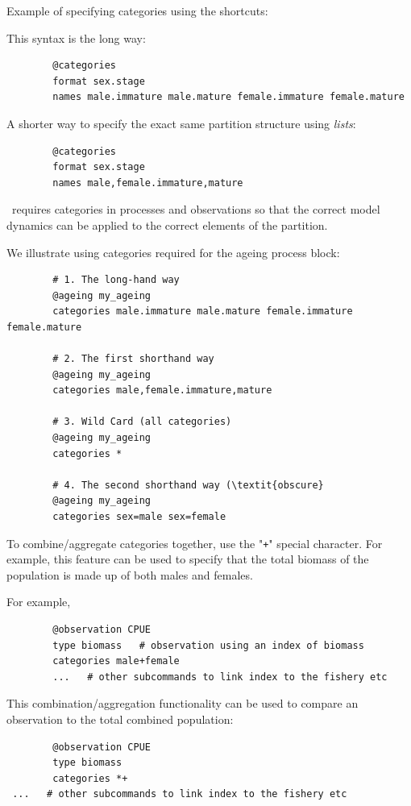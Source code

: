 Example of specifying categories using the shortcuts:

This syntax is the long way:
{\small{\begin{verbatim}
		@categories
		format sex.stage
		names male.immature male.mature female.immature female.mature
		\end{verbatim}}}

A shorter way to specify the exact same partition structure 
using \textit{lists}:
{\small{\begin{verbatim}
		@categories
		format sex.stage
		names male,female.immature,mature
		\end{verbatim}}}

\CNAME\ requires categories in processes and observations so that the correct model dynamics can be applied to the correct elements of the partition.

We illustrate using categories required for the ageing process block:
{\small{\begin{verbatim}
		# 1. The long-hand way
		@ageing my_ageing
		categories male.immature male.mature female.immature female.mature

		# 2. The first shorthand way
		@ageing my_ageing
		categories male,female.immature,mature

		# 3. Wild Card (all categories)
		@ageing my_ageing
		categories *

		# 4. The second shorthand way (\textit{obscure}
		@ageing my_ageing
		categories sex=male sex=female
		\end{verbatim}}}

To combine/aggregate categories together, use the "\texttt{+}" special character. For example, this feature can be used to specify that the total biomass of the population is made up of both males and females.

For example,

{\small{\begin{verbatim}
		@observation CPUE
		type biomass   # observation using an index of biomass
		categories male+female
        ...   # other subcommands to link index to the fishery etc
		\end{verbatim}}}

This combination/aggregation functionality can be used to compare an observation to the total combined population:

{\small{\begin{verbatim}
		@observation CPUE
		type biomass
		categories *+
 ...   # other subcommands to link index to the fishery etc
		\end{verbatim}}}

